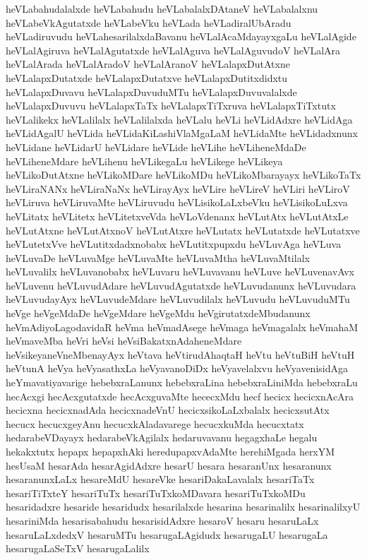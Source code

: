{heVLabahudalalxde
heVLabahudu
heVLabalalxDAtaneV
heVLabalalxnu
heVLabeVkAgutatxde
heVLabeVku
heVLada
heVLadiralUbAradu
heVLadiruvudu
heVLahesarilalxdaBavanu
heVLalAcaMdayayxgaLu
heVLalAgide
heVLalAgiruva
heVLalAgutatxde
heVLalAguva
heVLalAguvudoV
heVLalAra
heVLalArada
heVLalAradoV
heVLalAranoV
heVLalapxDutAtxne
heVLalapxDutatxde
heVLalapxDutatxve
heVLalapxDutitxdidxtu
heVLalapxDuvavu
heVLalapxDuvuduMTu
heVLalapxDuvuvalalxde
heVLalapxDuvuvu
heVLalapxTaTx
heVLalapxTiTxruva
heVLalapxTiTxtutx
heVLalikekx
heVLalilalx
heVLalilalxda
heVLalu
heVLi
heVLidAdxre
heVLidAga
heVLidAgalU
heVLida
heVLidaKiLashiVlaMgaLaM
heVLidaMte
heVLidadxnunx
heVLidane
heVLidarU
heVLidare
heVLide
heVLihe
heVLiheneMdaDe
heVLiheneMdare
heVLihenu
heVLikegaLu
heVLikege
heVLikeya
heVLikoDutAtxne
heVLikoMDare
heVLikoMDu
heVLikoMbarayayx
heVLikoTaTx
heVLiraNANx
heVLiraNaNx
heVLirayAyx
heVLire
heVLireV
heVLiri
heVLiroV
heVLiruva
heVLiruvaMte
heVLiruvudu
heVLisikoLaLxbeVku
heVLisikoLuLxva
heVLitatx
heVLitetx
heVLitetxveVda
heVLoVdenanx
heVLutAtx
heVLutAtxLe
heVLutAtxne
heVLutAtxnoV
heVLutAtxre
heVLutatx
heVLutatxde
heVLutatxve
heVLutetxVve
heVLutitxdadxnobabx
heVLutitxpupxdu
heVLuvAga
heVLuva
heVLuvaDe
heVLuvaMge
heVLuvaMte
heVLuvaMtha
heVLuvaMtilalx
heVLuvalilx
heVLuvanobabx
heVLuvaru
heVLuvavanu
heVLuve
heVLuvenavAvx
heVLuvenu
heVLuvudAdare
heVLuvudAgutatxde
heVLuvudanunx
heVLuvudara
heVLuvudayAyx
heVLuvudeMdare
heVLuvudilalx
heVLuvudu
heVLuvuduMTu
heVge
heVgeMdaDe
heVgeMdare
heVgeMdu
heVgirutatxdeMbudanunx
heVmAdiyoLagodavidaR
heVma
heVmadAsege
heVmaga
heVmagalalx
heVmahaM
heVmaveMba
heVri
heVsi
heVsiBakatxnAdaheneMdare
heVsikeyaneVneMbenayAyx
heVtava
heVtirudAhaqtaH
heVtu
heVtuBiH
heVtuH
heVtunA
heVya
heVyasathxLa
heVyavanoDiDx
heVyavelalxvu
heVyavenisidAga
heYmavatiyavarige
hebebxraLanunx
hebebxraLina
hebebxraLiniMda
hebebxraLu
hecAcxgi
hecAcxgutatxde
hecAcxguvaMte
hececxMdu
hecf
hecicx
hecicxnAcAra
hecicxna
hecicxnadAda
hecicxnadeVnU
hecicxsikoLaLxbalalx
hecicxsutAtx
hecucx
hecucxgeyAnu
hecucxkAladavarege
hecucxkuMda
hecucxtatx
hedarabeVDayayx
hedarabeVkAgilalx
hedaruvavanu
hegagxhaLe
hegalu
hekakxtutx
hepapx
hepapxhAki
heredupapxvAdaMte
herehiMgada
herxYM
hesUsaM
hesarAda
hesarAgidAdxre
hesarU
hesara
hesaranUnx
hesaranunx
hesaranunxLaLx
hesareMdU
hesareVke
hesariDakaLavalalx
hesariTaTx
hesariTiTxteY
hesariTuTx
hesariTuTxkoMDavara
hesariTuTxkoMDu
hesaridadxre
hesaride
hesaridudx
hesarilalxde
hesarina
hesarinalilx
hesarinalilxyU
hesariniMda
hesarisabahudu
hesarisidAdxre
hesaroV
hesaru
hesaruLaLx
hesaruLaLxdedxV
hesaruMTu
hesarugaLAgidudx
hesarugaLU
hesarugaLa
hesarugaLaSeTxV
hesarugaLalilx
}
